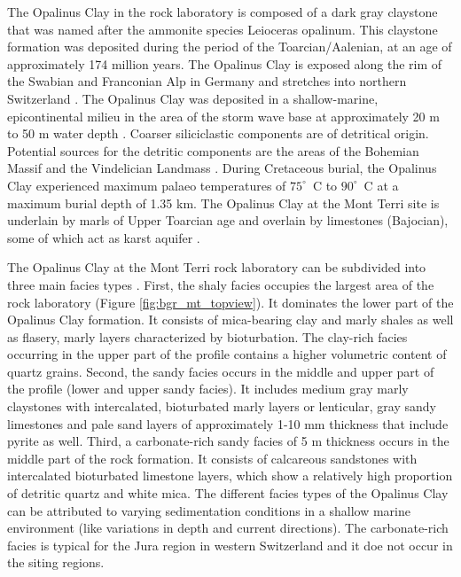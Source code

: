 The Opalinus Clay in the rock laboratory is composed of a dark gray claystone that was named after the ammonite species Leioceras opalinum. This claystone formation was deposited during the period of the Toarcian/Aalenian, at an age of approximately 174 million years. The Opalinus Clay is exposed along the rim of the Swabian and Franconian Alp in Germany and stretches into northern Switzerland \cite{einsele1983}. The Opalinus Clay was deposited in a shallow-marine, epicontinental milieu in the area of the storm wave base at approximately 20 m to 50 m water depth \cite{wetzel2003}. Coarser siliciclastic components are of detritical origin. Potential sources for the detritic components are the areas of the Bohemian Massif and the Vindelician Landmass \cite{wetzel2003}. During Cretaceous burial, the Opalinus Clay experienced maximum palaeo temperatures of $75^{\circ}$~C to $90^{\circ}$~C \cite{bossart2008} at a maximum burial depth of 1.35 km. The Opalinus Clay at the Mont Terri site is underlain by  marls of Upper Toarcian age and overlain by limestones (Bajocian), some of which act as karst aquifer \cite{pearson2003}.

The Opalinus Clay at the Mont Terri rock laboratory can be subdivided into three main facies types \cite{bossart2008}. First, the shaly facies occupies the largest area of the rock laboratory (Figure \ref{fig:bgr_mt_topview}). It dominates the lower part of the Opalinus Clay formation. It consists of mica-bearing clay and marly shales as well as flasery, marly layers characterized by bioturbation. The clay-rich facies occurring in the upper part of the profile contains a higher volumetric content of quartz grains. Second, the sandy facies occurs in the middle and upper part of the profile (lower and upper sandy facies). It includes medium gray marly claystones with intercalated, bioturbated marly layers or lenticular, gray sandy limestones and pale sand layers of approximately 1-10 mm thickness that include pyrite as well. Third, a carbonate-rich sandy facies of 5 m thickness occurs in the middle part of the rock formation. It consists of calcareous sandstones with intercalated bioturbated limestone layers, which show a relatively high proportion of detritic quartz and white mica. The different facies types of the Opalinus Clay can be attributed to varying sedimentation conditions in a shallow marine environment (like variations in depth and current directions). The carbonate-rich facies is typical for the Jura region in western Switzerland and it doe not occur in the siting regions.

